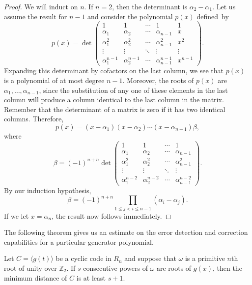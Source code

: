 \begin{proof}
We will induct on $n$. If $n = 2$, then the determinant is $\alpha_2 - \alpha_1$.  Let us assume the result for $n  - 1$ and consider the polynomial $p(x)$ defined~by
\[
p(x)
=
\det
\begin{pmatrix}
1              & 1              & \cdots & 1              & 1 \\
\alpha_1       & \alpha_2       & \cdots & \alpha_{n-1}   & x \\
\alpha_1^2     & \alpha_2^2     & \cdots & \alpha_{n-1}^2 & x^2 \\
\vdots         & \vdots         & \ddots & \vdots         & \vdots \\
\alpha_1^{n-1} & \alpha_2^{n-1} & \cdots & \alpha_{n-1}^{n-1} & x^{n-1}
\end{pmatrix}.
\]
Expanding this determinant by cofactors on the last column, we see that $p(x)$ is a polynomial of at most degree $n-1$.  Moreover, the roots of $p(x)$ are $\alpha_1, \ldots, \alpha_{n-1}$, since the substitution of any one of these elements in the last column will produce a column identical to the last column in the matrix.  Remember that the determinant of a matrix is zero if it has two identical columns. Therefore,     
\[
p(x) = (x - \alpha_1)(x - \alpha_2) \cdots (x - \alpha_{n-1}) \beta, 
\]
where
\[
\beta = (-1)^{n+n}
\det
\begin{pmatrix}
1              & 1              & \cdots & 1 \\
\alpha_1       & \alpha_2       & \cdots & \alpha_{n-1} \\
\alpha_1^2     & \alpha_2^2     & \cdots & \alpha_{n-1}^2 \\
\vdots         & \vdots         & \ddots & \vdots \\
\alpha_1^{n-2} & \alpha_2^{n-2} & \cdots & \alpha_{n-1}^{n-2} 
\end{pmatrix}.
\]
By our induction hypothesis,
\[
\beta = (-1)^{n+n} \prod_{1 \leq j < i \leq n-1} (\alpha_i - \alpha_j).
\]
If we let $x = \alpha_n$, the result now follows immediately.
\end{proof}

\medskip

The following theorem gives us an estimate on the error detection and correction capabilities for a particular generator polynomial.

\begin{theorem}\label{finite:min_dist_theorem}
Let $C = \langle g(t) \rangle$ be a cyclic code in $R_n$ and suppose that $\omega$ is a primitive $n$th root of unity over ${\mathbb Z}_2$.  If $s$ consecutive powers of $\omega$ are roots of $g(x)$, then the minimum distance of $C$ is at least $s+1$.
\end{theorem}


